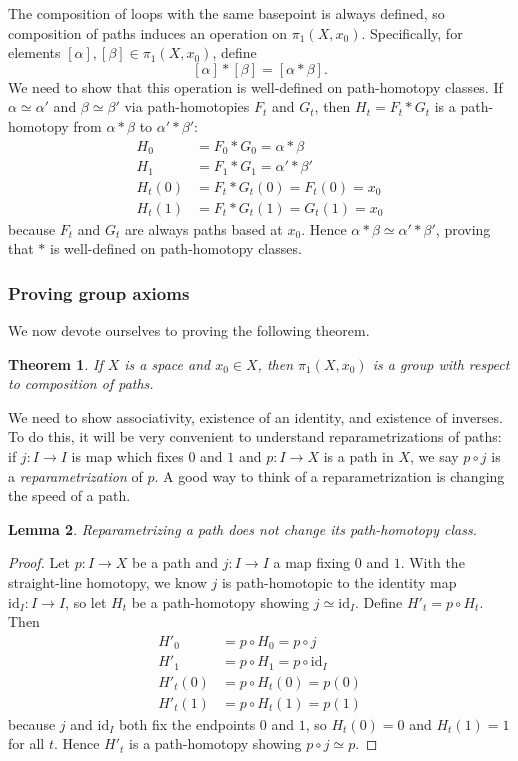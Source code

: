 \documentclass{article}
\newtheorem{thm}{Theorem}[section]
\newtheorem{lem}[thm]{Lemma}
\theoremstyle{definition}
\theoremstyle{remark}
\numberwithin{figure}{section}
\begin{document}
The composition of loops with the same basepoint is always defined, so composition of paths induces an operation on $\pi_1(X, x_0)$. Specifically, for elements $[\alpha], [\beta] \in \pi_1(X, x_0)$, define
\[
[\alpha] * [\beta] = [\alpha * \beta].
\]
We need to show that this operation is well-defined on path-homotopy classes. If $\alpha \simeq \alpha'$ and $\beta \simeq \beta'$ via path-homotopies $F_t$ and $G_t$, then $H_t = F_t * G_t$ is a path-homotopy from $\alpha * \beta$ to $\alpha' * \beta'$:
\begin{align*}
	H_0 &= F_0 * G_0 = \alpha * \beta\\
	H_1 &= F_1 * G_1 = \alpha' * \beta'\\
	H_t(0) &= F_t * G_t(0) = F_t(0) = x_0\\
	H_t(1) &= F_t * G_t(1) = G_t(1) = x_0
\end{align*}
because $F_t$ and $G_t$ are always paths based at $x_0$. Hence $\alpha * \beta \simeq \alpha' * \beta'$, proving that $*$ is well-defined on path-homotopy classes.

\subsubsection{Proving group axioms}
We now devote ourselves to proving the following theorem.

\begin{thm}
	If $X$ is a space and $x_0 \in X$, then $\pi_1(X, x_0)$ is a group with respect to composition of paths.
\end{thm}

We need to show associativity, existence of an identity, and existence of inverses. To do this, it will be very convenient to understand reparametrizations of paths: if $j : I \to I$ is map which fixes $0$ and $1$ and $p : I \to X$ is a path in $X$, we say $p \circ j$ is a \emph{reparametrization} of $p$. A good way to think of a reparametrization is changing the speed of a path.

\begin{lem}\label{lem:reparametrization}
	Reparametrizing a path does not change its path-homotopy class.
\end{lem}

\begin{proof}
	Let $p : I \to X$ be a path and $j : I \to I$ a map fixing $0$ and $1$. With the straight-line homotopy, we know $j$ is path-homotopic to the identity map $\mathrm{id}_I : I \to I$, so let $H_t$ be a path-homotopy showing $j \simeq \mathrm{id}_I$. Define $H'_t = p \circ H_t$. Then
	\begin{align*}
		H'_0 &= p \circ H_0 = p \circ j\\
		H'_1 &= p \circ H_1 = p \circ \mathrm{id}_I\\
		H'_t(0) &= p \circ H_t(0) = p(0)\\
		H'_t(1) &= p \circ H_t(1) = p(1)
	\end{align*}
	because $j$ and $\mathrm{id}_I$ both fix the endpoints $0$ and $1$, so $H_t(0) = 0$ and $H_t(1) = 1$ for all $t$. Hence $H'_t$ is a path-homotopy showing $p \circ j \simeq p$.
\end{proof}
\end{document}
